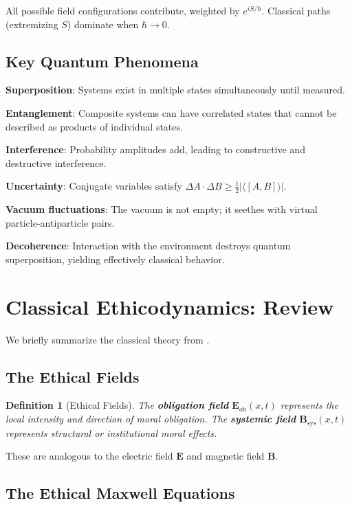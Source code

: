 \documentclass[12pt]{article}
\newtheorem{definition}{Definition}[section]
\begin{document}
All possible field configurations contribute, weighted by $e^{iS/\hbar}$. Classical paths (extremizing $S$) dominate when $\hbar \to 0$.

\subsection{Key Quantum Phenomena}

\textbf{Superposition}: Systems exist in multiple states simultaneously until measured.

\textbf{Entanglement}: Composite systems can have correlated states that cannot be described as products of individual states.

\textbf{Interference}: Probability amplitudes add, leading to constructive and destructive interference.

\textbf{Uncertainty}: Conjugate variables satisfy $\Delta A \cdot \Delta B \geq \frac{1}{2} |\langle [A,B] \rangle|$.

\textbf{Vacuum fluctuations}: The vacuum is not empty; it seethes with virtual particle-antiparticle pairs.

\textbf{Decoherence}: Interaction with the environment destroys quantum superposition, yielding effectively classical behavior.

\section{Classical Ethicodynamics: Review}

We briefly summarize the classical theory from \cite{bond2025noether}.

\subsection{The Ethical Fields}

\begin{definition}[Ethical Fields]
The \textbf{obligation field} $\mathbf{E}_{\mathrm{ob}}(x,t)$ represents the local intensity and direction of moral obligation. The \textbf{systemic field} $\mathbf{B}_{\mathrm{sys}}(x,t)$ represents structural or institutional moral effects.
\end{definition}

These are analogous to the electric field $\mathbf{E}$ and magnetic field $\mathbf{B}$.

\subsection{The Ethical Maxwell Equations}
\end{document}
